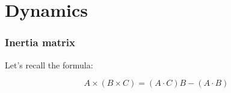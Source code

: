 \section{Dynamics}

\subsubsection{Inertia matrix}
Let's recall the formula:

\[A \times (B \times C) = (A \cdot C)B - (A \cdot B)\]

